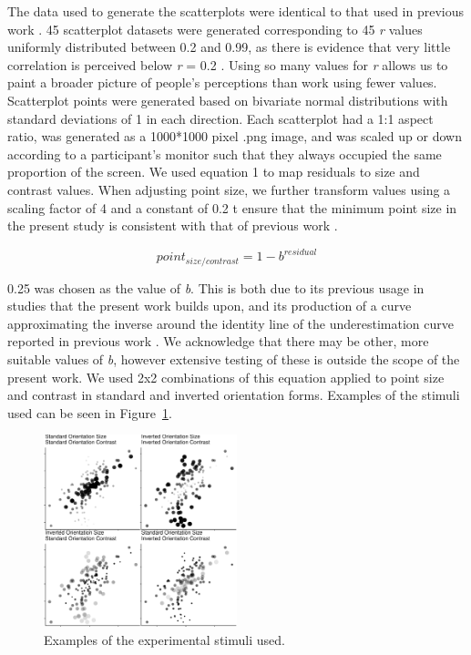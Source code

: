 \documentclass[manuscript, review, anonymous, screen]{acmart}
\begin{document}
The data used to generate the scatterplots were identical to that used
in previous work \citep{strain_2023, strain_2023b}. 45 scatterplot
datasets were generated corresponding to 45 \emph{r} values uniformly
distributed between 0.2 and 0.99, as there is evidence that very little
correlation is perceived below \emph{r} = 0.2
\citep{strahan_1978, bobko_1979, cleveland_1982}. Using so many values
for \emph{r} allows us to paint a broader picture of people's
perceptions than work using fewer values. Scatterplot points were
generated based on bivariate normal distributions with standard
deviations of 1 in each direction. Each scatterplot had a 1:1 aspect
ratio, was generated as a 1000*1000 pixel .png image, and was scaled up
or down according to a participant's monitor such that they always
occupied the same proportion of the screen. We used equation 1 to map
residuals to size and contrast values. When adjusting point size, we
further transform values using a scaling factor of 4 and a constant of
0.2 t ensure that the minimum point size in the present study is
consistent with that of previous work \citep{strain_2023, strain_2023b}.

\begin{equation}
  point_{size/contrast} = 1 - b^{residual}
\end{equation}

0.25 was chosen as the value of \emph{b}. This is both due to its
previous usage in studies that the present work builds upon, and its
production of a curve approximating the inverse around the identity line
of the underestimation curve reported in previous work
\citep{rensink_2017, strain_2023, strain_2023b}. We acknowledge that
there may be other, more suitable values of \emph{b}, however extensive
testing of these is outside the scope of the present work. We used 2x2
combinations of this equation applied to point size and contrast in
standard and inverted orientation forms. Examples of the stimuli used
can be seen in Figure~\ref{fig-examples}.

\begin{figure}

\includegraphics[width=0.5\textwidth,height=\textheight]{size_and_contrast_new_files/figure-pdf/fig-examples-1.pdf} \hfill{}

\caption{\label{fig-examples}Examples of the experimental stimuli used.}

\end{figure}
\end{document}
